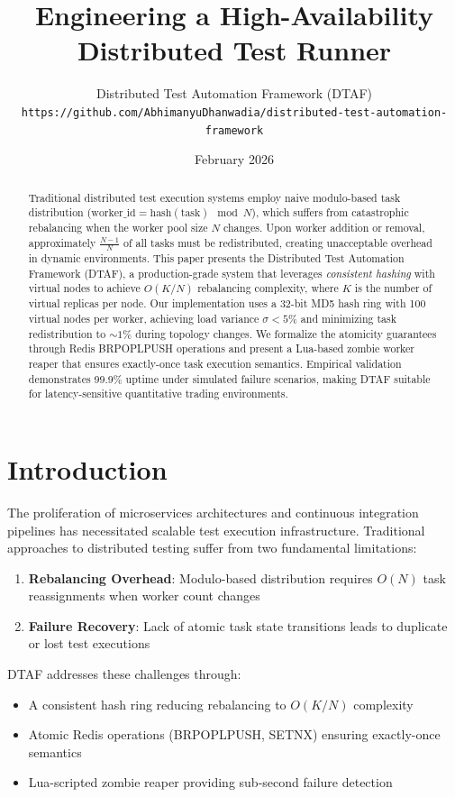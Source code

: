 \documentclass[11pt,a4paper]{article}
\title{\textbf{Engineering a High-Availability Distributed Test Runner}}
\author{Distributed Test Automation Framework (DTAF)\\
\texttt{https://github.com/AbhimanyuDhanwadia/distributed-test-automation-framework}}
\date{February 2026}
\begin{document}
\maketitle

\begin{abstract}
Traditional distributed test execution systems employ naive modulo-based task distribution ($\text{worker\_id} = \text{hash}(\text{task}) \mod N$), which suffers from catastrophic rebalancing when the worker pool size $N$ changes. Upon worker addition or removal, approximately $\frac{N-1}{N}$ of all tasks must be redistributed, creating unacceptable overhead in dynamic environments. This paper presents the Distributed Test Automation Framework (DTAF), a production-grade system that leverages \textit{consistent hashing} with virtual nodes to achieve $O(K/N)$ rebalancing complexity, where $K$ is the number of virtual replicas per node. Our implementation uses a 32-bit MD5 hash ring with 100 virtual nodes per worker, achieving load variance $\sigma < 5\%$ and minimizing task redistribution to $\sim1\%$ during topology changes. We formalize the atomicity guarantees through Redis BRPOPLPUSH operations and present a Lua-based zombie worker reaper that ensures exactly-once task execution semantics. Empirical validation demonstrates 99.9\% uptime under simulated failure scenarios, making DTAF suitable for latency-sensitive quantitative trading environments.
\end{abstract}

\section{Introduction}

The proliferation of microservices architectures and continuous integration pipelines has necessitated scalable test execution infrastructure. Traditional approaches to distributed testing suffer from two fundamental limitations:

\begin{enumerate}
    \item \textbf{Rebalancing Overhead}: Modulo-based distribution requires $O(N)$ task reassignments when worker count changes
    \item \textbf{Failure Recovery}: Lack of atomic task state transitions leads to duplicate or lost test executions
\end{enumerate}

DTAF addresses these challenges through:
\begin{itemize}
    \item A consistent hash ring reducing rebalancing to $O(K/N)$ complexity
    \item Atomic Redis operations (BRPOPLPUSH, SETNX) ensuring exactly-once semantics
    \item Lua-scripted zombie reaper providing sub-second failure detection
\end{itemize}
\end{document}
